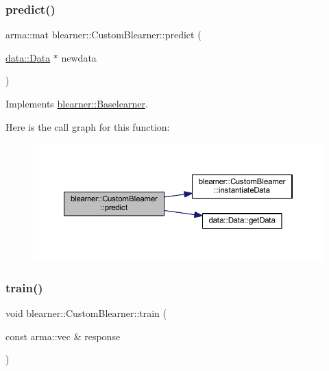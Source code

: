 \subsubsection{\texorpdfstring{predict()}{predict()}\hspace{0.1cm}{\footnotesize\ttfamily [2/2]}}
{\footnotesize\ttfamily arma\+::mat blearner\+::\+Custom\+Blearner\+::predict (\begin{DoxyParamCaption}\item[{\mbox{\hyperlink{classdata_1_1_data}{data\+::\+Data}} $\ast$}]{newdata }\end{DoxyParamCaption})\hspace{0.3cm}{\ttfamily [virtual]}}



Implements \mbox{\hyperlink{classblearner_1_1_baselearner_ae2ef5e018783578e02b3b5a33fa94eae}{blearner\+::\+Baselearner}}.

Here is the call graph for this function\+:\nopagebreak
\begin{figure}[H]
\begin{center}
\leavevmode
\includegraphics[width=350pt]{classblearner_1_1_custom_blearner_a401a479834eb3896260cb57b4551ceb4_cgraph}
\end{center}
\end{figure}
\mbox{\label{classblearner_1_1_custom_blearner_a4726c5b861b67817f7b3eb61d8f6c0d7}} 
\subsubsection{\texorpdfstring{train()}{train()}}
{\footnotesize\ttfamily void blearner\+::\+Custom\+Blearner\+::train (\begin{DoxyParamCaption}\item[{const arma\+::vec \&}]{response }\end{DoxyParamCaption})\hspace{0.3cm}{\ttfamily [virtual]}}



